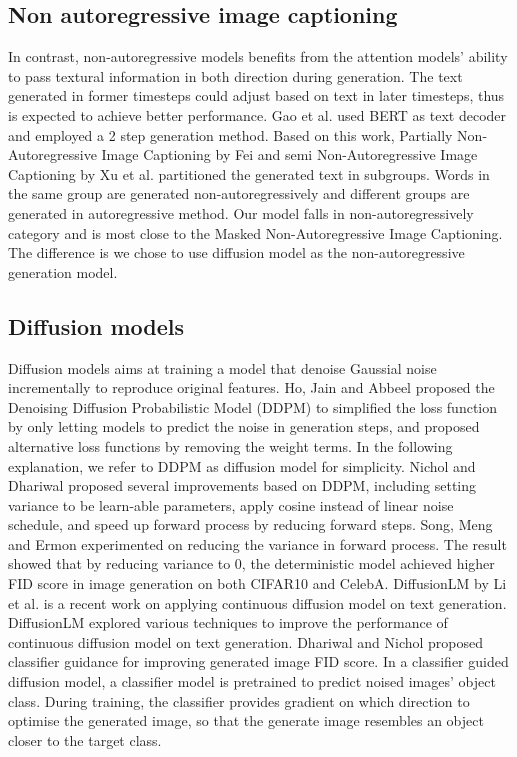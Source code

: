 \documentclass{article}
\begin{document}
\subsection{Non autoregressive image captioning}
In contrast, non-autoregressive models benefits from the attention models' ability to pass textural information in both direction during generation. The text generated in former timesteps could adjust based on text in later timesteps, thus is expected to achieve better performance. Gao et al.\cite{masked-non-autoregres} used BERT\cite{bert} as text decoder and employed a 2 step generation method. Based on this work, Partially Non-Autoregressive Image Captioning by Fei \cite{partial-autoregressive} and semi Non-Autoregressive Image Captioning by Xu et al. \cite{semi-autoregressive} partitioned the generated text in subgroups. Words in the same group are generated non-autoregressively and different groups are generated in autoregressive method. Our model falls in non-autoregressively category and is most close to the Masked Non-Autoregressive Image Captioning\cite{masked-non-autoregres}. The difference is we chose to use diffusion model as the non-autoregressive generation model.

\subsection{Diffusion models}
Diffusion models aims at training a model that denoise Gaussial noise incrementally to reproduce original features. Ho, Jain and Abbeel\cite{ddpm} proposed the Denoising Diffusion Probabilistic Model (DDPM) to simplified the loss function by only letting models to predict the noise in generation steps, and proposed alternative loss functions by removing the weight terms. In the following explanation, we refer to DDPM as diffusion model for simplicity. Nichol and Dhariwal\cite{improved-ddpm} proposed several improvements based on DDPM, including setting variance to be learn-able parameters, apply cosine instead of linear noise schedule, and speed up forward process by reducing forward steps. Song, Meng and Ermon\cite{ddim} experimented on reducing the variance in forward process. The result showed that by reducing variance to 0, the deterministic model achieved higher FID score in image generation on both CIFAR10 and CelebA. DiffusionLM by Li et al. \cite{diffuselm} is a recent work on applying continuous diffusion model on text generation. DiffusionLM explored various techniques to improve the performance of continuous diffusion model on text generation. Dhariwal and Nichol \cite{diffuseBeatGan} proposed classifier guidance for improving generated image FID score. In a classifier guided diffusion model, a classifier model is pretrained to predict noised images' object class. During training, the classifier provides gradient on which direction to optimise the generated image, so that the generate image resembles an object closer to the target class. 
\end{document}
